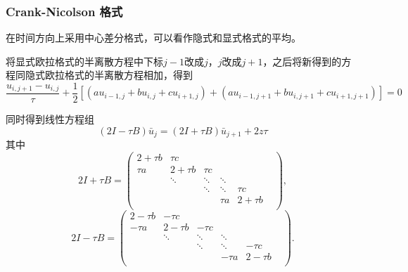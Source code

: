 \documentclass{article}
\begin{document}
\subsubsection{Crank-Nicolson 格式}

在时间方向上采用中心差分格式，可以看作隐式和显式格式的平均。

将显式欧拉格式的半离散方程中下标$j-1$改成$j$，$j$改成$j+1$，之后将新得到的方程同隐式欧拉格式的半离散方程相加，得到
$$\frac{u_{i, j+1} - u_{i, j}}{\tau} + \frac{1}{2}[(au_{i-1, j} + bu_{i, j} + cu_{i+1, j}) + (au_{i-1, j+1} + bu_{i, j+1} + cu_{i+1, j+1})] = 0$$

同时得到线性方程组$$(2I - \tau B)\bar{u}_{j} = (2I + \tau B)\bar{u}_{j+1} + 2z\tau$$
其中
$$
2I + \tau B = \begin{pmatrix}
                2 +\tau b  &   \tau c     &            &            &            & \\
                \tau a     &   2 +\tau b  &   \tau c   &            &            & \\
                           &   \ddots     &   \ddots   &   \ddots   &            & \\
                           &              &   \ddots   &   \ddots   &  \tau c    & \\
                           &              &            &   \tau a   &  2 +\tau b & \\
            \end{pmatrix},
$$
$$
2I - \tau B = \begin{pmatrix}
                2 -\tau b  &   -\tau c    &            &            &            & \\
                -\tau a    &   2 -\tau b  &   -\tau c  &            &            & \\
                           &   \ddots     &   \ddots   &   \ddots   &            & \\
                           &              &   \ddots   &   \ddots   &  -\tau c   & \\
                           &              &            &   -\tau a  &  2 -\tau b & \\
            \end{pmatrix}.
$$
\end{document}
